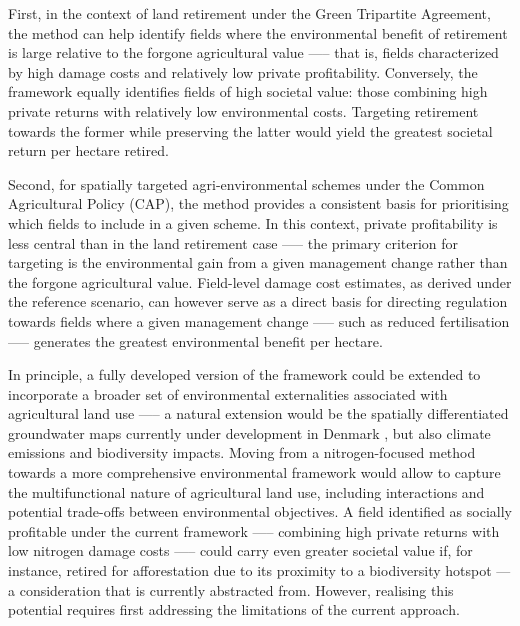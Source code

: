 \documentclass[12pt]{article}
\begin{document}
First, in the context of land retirement under the Green Tripartite Agreement, the method can help identify fields where the environmental benefit of retirement is large relative to the forgone agricultural value —-- that is, fields characterized by high damage costs and relatively low private profitability. Conversely, the framework equally identifies fields of high societal value: those combining high private returns with relatively low environmental costs. Targeting retirement towards the former while preserving the latter would yield the greatest societal return per hectare retired.



Second, for spatially targeted agri-environmental schemes under the Common Agricultural Policy (CAP), the method provides a consistent basis for prioritising which fields to include in a given scheme. In this context, private profitability is less central than in the land retirement case —-- the primary criterion for targeting is the environmental gain from a given management change rather than the forgone agricultural value. Field-level damage cost estimates, as derived under the reference scenario, can however serve as a direct basis for directing regulation towards fields where a given management change —-- such as reduced fertilisation —-- generates the greatest environmental benefit per hectare.



In principle, a fully developed version of the framework could be extended to incorporate a broader set of environmental externalities associated with agricultural land use —-- a natural extension would be the spatially differentiated groundwater maps currently under development in Denmark \citep{miljostyrelsen_sgo}, but also climate emissions and biodiversity impacts. Moving from a nitrogen-focused method towards a more comprehensive environmental framework would allow to capture the multifunctional nature of agricultural land use, including interactions and potential trade-offs between environmental objectives. A field identified as socially profitable under the current framework —-- combining high private returns with low nitrogen damage costs —-- could carry even greater societal value if, for instance,  retired for afforestation due to its proximity to a biodiversity hotspot --- a consideration that is currently abstracted from. However, realising this potential requires first addressing the limitations of the current approach.


\newpage
\end{document}
